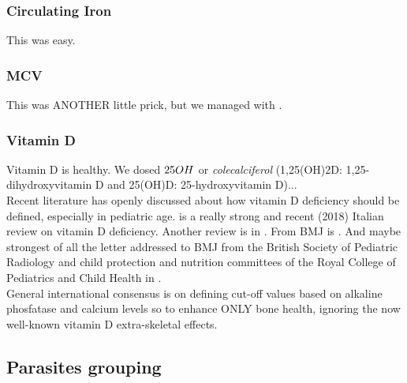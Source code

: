 
\subsubsection{Circulating Iron}\label{sub:iron}
This was easy.


\subsubsection{MCV}\label{sub:mcv}
This was ANOTHER little prick, but we managed with \cite{MCVferritincutoff}.


\subsubsection{Vitamin D}\label{sub:vitaminD}
Vitamin D is healthy. We dosed $25\-OH$ or \textit{colecalciferol} (1,25(OH)2D: 1,25-dihydroxyvitamin D and 25(OH)D: 25-hydroxyvitamin D)...\\
Recent literature has openly discussed about how vitamin D deficiency should be defined, especially in pediatric age. \cite{vitDcutoff1} is a really strong and recent (2018) Italian review on vitamin D deficiency. Another review is in \cite{vitDcutoff2}. From BMJ is \cite{vitDcutoff3}. And maybe strongest of all the letter addressed to BMJ from the British Society of Pediatric Radiology and child protection and nutrition committees of the Royal College of Pediatrics and Child Health in \cite{vitDcutoff_letter}.\\
General international consensus is on defining cut-off values based on alkaline phosfatase and calcium levels so to enhance ONLY bone health, ignoring the now well-known vitamin D extra-skeletal effects.


\subsection{Parasites grouping}\label{sub:parasites}

